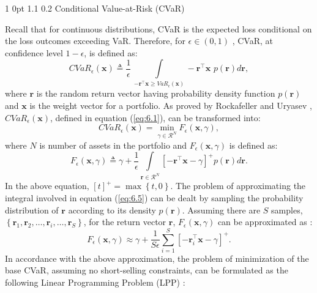 \documentclass[12pt]{article}
\makeatletter
\numberwithin{equation}{section}
\renewcommand{\subsection}{
  \@startsection
  {subsection}%
  {1}%
  {0pt}%
  {1.1\baselineskip}%
  {0.2\baselineskip}%
  {\sc \centering}%
}
\makeatother
\begin{document}
\subsection {Conditional Value-at-Risk (CVaR)}

Recall that for continuous distributions, CVaR is the expected loss conditional on the loss outcomes exceeding VaR.
Therefore, for $\epsilon \in (0,1)$ , CVaR, at confidence level $1-\epsilon$, is defined as:
\begin{equation}
\label{eq:6.1}
CVaR_{\epsilon}(\mathbf{x}) \triangleq \frac{1}{\epsilon} \, \int \limits_{-\mathbf{r}^{\top}\mathbf{x} \geq VaR_{\epsilon}(\mathbf{x})} -\mathbf{r}^{\top}\mathbf{x} \, \, p(\mathbf{r})  d\mathbf{r},
\end{equation}
where $\mathbf{r}$ is the random return vector having probability density function $p(\mathbf{r})$ and $\mathbf{x}$ is the weight vector for a portfolio.
As proved by Rockafeller and Uryasev \cite{Rockafellar1} , $CVaR_{\epsilon}(\mathbf{x})$, defined in equation (\ref{eq:6.1}), can be transformed into:
\begin{equation}
CVaR_{\epsilon}(\mathbf{x})=\min_{\gamma \in \mathcal{R}^{N}} F_{\epsilon}(\mathbf{x},\gamma),
\label{eq:6.4}
\end{equation}
where $N$ is number of assets in the portfolio and $F_{\epsilon}(\mathbf{x},\gamma)$ is defined as:
\begin{equation}
F_{\epsilon}(\mathbf{x},\gamma) \triangleq \gamma+\frac{1}{\epsilon} \int \limits_{\mathbf{r} \in \mathcal{R}^{N}}
\left[-\mathbf{r}^{\top}\mathbf{x}-\gamma\right]^{+} p(\mathbf{r}) d\mathbf{r}.
\label{eq:6.5}
\end{equation}
In the above equation, $\left[t\right]^{+}=\max \left\{t,0\right\}$. The problem of approximating the integral involved in equation (\ref{eq:6.5})
can be dealt by sampling the probability distribution of $\mathbf{r}$ according to its density $p(\mathbf{r})$. Assuming there are $S$ samples,
$\displaystyle{\left\{\mathbf{r}_{1},\mathbf{r}_{2},\dots,\mathbf{r}_{i},\dots,\mathbf{r}_{S}\right\}}$, for the return vector $\mathbf{r}$,
$F_{\epsilon}(\mathbf{x},\gamma)$ can be approximated as \cite{Rockafellar1}:
\begin{equation}
F_{\epsilon}(\mathbf{x},\gamma) \approx \gamma+\frac{1}{S\epsilon}\sum\limits_{i=1}^{S} \left[-\mathbf{r}_{i}^{\top}\mathbf{x}-\gamma\right]^{+}.
\label{eq:6.6}
\end{equation}
In accordance with the above approximation, the problem of minimization of the base CVaR, assuming no short-selling constraints, can be formulated as the following Linear Programming Problem (LPP) \cite{Rockafellar1,Zhu}:
\end{document}

